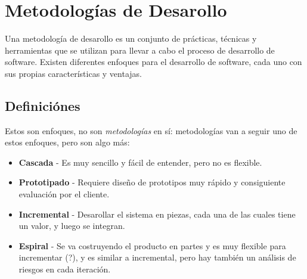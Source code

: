 \chapter{Metodologías de Desarollo}

Una metodología de desarollo es un conjunto de prácticas, técnicas y herramientas que se utilizan para llevar a cabo el proceso de desarrollo de software. Existen diferentes enfoques para el desarrollo de software, cada uno con sus propias características y ventajas.

\section{Definiciónes}

{Estos son enfoques, no son \textit{metodologías} en sí: metodologías van a seguir uno de estos enfoques, pero son algo más:\ns
\begin{itemize}
   \item \textbf{Cascada} - Es muy sencillo y fácil de entender, pero no es flexible.
   \item \textbf{Prototipado} - Requiere diseño de prototipos muy rápido y consiguiente evaluación por el cliente.
   \item \textbf{Incremental} - Desarollar el sistema en piezas, cada una de las cuales tiene un valor, y luego se integran.
   \item \textbf{Espiral} - Se va costruyendo el producto en partes y es muy flexible para incrementar (?), y es similar a incremental, pero hay también un análisis de riesgos en cada iteración.
\end{itemize}}

